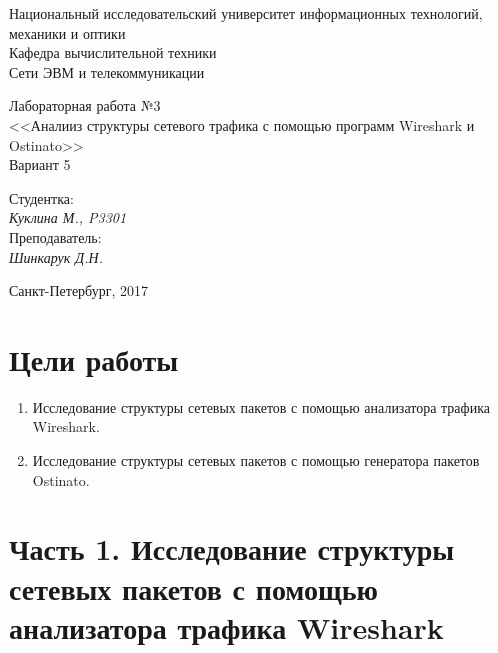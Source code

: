 \documentclass[12pt, a4paper] {ncc}
\begin{document}
\setcounter{figure}{0}
\frenchspacing
\pagestyle{empty}
\begin{center}
     Национальный исследовательский университет информационных технологий,
                              механики и оптики\\
                        Кафедра вычислительной техники\\
                          Сети ЭВМ и телекоммуникации
\end{center}
\begin{center}
                            Лабораторная работа №3\\
                <<Аналииз структуры сетевого трафика с помощью программ Wireshark и Ostinato>>\\
                                Вариант 5
\end{center}
\begin{flushright}
                                          Студентка:\\
                                                         {\it Куклина М., P3301} \\
                                          Преподаватель:\\
                                                         {\it Шинкарук Д.Н. }
\end{flushright}
\begin{center}
                             Санкт-Петербург, 2017
\end{center}
\newpage


\section*{Цели работы}
\begin{enumerate}
    \item Исследование структуры сетевых пакетов с помощью анализатора трафика Wireshark.
    \item Исследование структуры сетевых пакетов с помощью генератора пакетов Ostinato.
\end{enumerate}

\section*{Часть 1. Исследование структуры сетевых пакетов с помощью анализатора трафика Wireshark}
\end{document}
